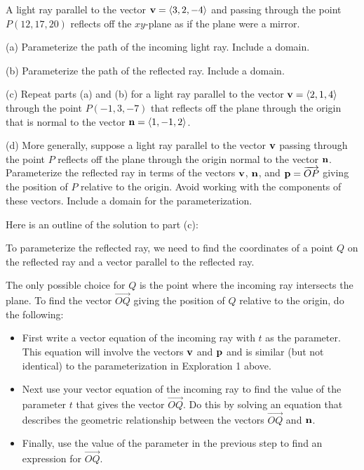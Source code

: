 \documentclass{ximera}
\begin{document}
\begin{question}  \label{Qdr5577:Lines}
A light ray parallel to the vector ${\bf v} = \langle 3,2,-4 \rangle$ and passing through the point $P(12, 17,20)$ reflects off the $xy$-plane as if the plane were a mirror.

(a) Parameterize the path of the incoming light ray. Include a domain.

(b) Parameterize the path of the reflected ray. Include a domain.

(c) Repeat parts (a) and (b) for a light ray parallel to the vector ${\bf v} = \langle 2,1,4 \rangle$ through the point $P(-1,3,-7)$ that reflects off the plane through the origin that is normal to the vector ${\bf n} = \langle  1, -1, 2 \rangle$.

(d) More generally, suppose a light ray parallel to the vector ${\bf v}$ passing through the point $P$ reflects off the plane through the origin normal to the vector ${\bf n}$. Parameterize the reflected ray in terms of the vectors ${\bf v}$, ${\bf n}$, and ${\bf p} = \overrightarrow{OP}$ giving the position of $P$ relative to the origin. Avoid working with the components of these vectors. Include a domain for the parameterization.

Here is an outline of the solution to part (c):

To parameterize the reflected ray, we need to find the coordinates of a point $Q$ on the reflected ray and a vector parallel to the reflected ray. 

The only possible choice for $Q$ is the point where the incoming ray intersects the plane. To find the vector $\overrightarrow{OQ}$ giving the position of $Q$ relative to the origin, do the following:

\begin{itemize}

\item{First write a vector equation of the incoming ray with $t$ as the parameter. This equation will involve the vectors ${\bf v}$ and ${\bf  p}$ and is similar (but not identical) to the parameterization in Exploration 1 above.} 

\item{Next use your vector equation of the incoming ray to find the value of the parameter $t$ that gives the vector $\overrightarrow{OQ}$. Do this by solving an equation that describes the geometric relationship between the vectors $\overrightarrow{OQ}$ and ${\bf n}$. }

\item{Finally, use the value of the parameter in the previous step to find an expression for $\overrightarrow{OQ}$.}


\end{itemize}
\end{question}
\end{document}
